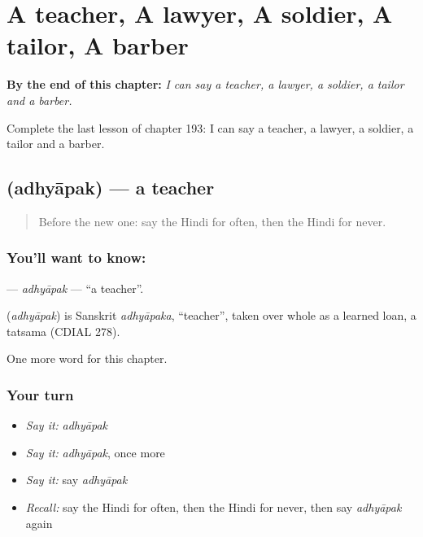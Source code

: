 
\chapter{A teacher, A lawyer, A soldier, A tailor, A barber}
\label{ch:hi-a-teacher-a-lawyer-a-soldier-a-tailor-a-barber}

\begin{chapteropening}
\textbf{By the end of this chapter:} \emph{I can say a teacher, a lawyer, a soldier, a tailor and a barber.}

Complete the last lesson of chapter 193: I can say a teacher, a lawyer, a soldier, a tailor and a barber.
\end{chapteropening}

\section[\texorpdfstring{\hi{अध्यापक} (adhyāpak)}{अध्यापक (adhyāpak)}]{ (adhyāpak) — a teacher}

\label{lesson:HI-C193-adhyapak}



\begin{quote}
Before the new one: say the Hindi for often, then the Hindi for never.
\end{quote}

\subsection*{You'll want to know: }
\textbf{} — \emph{adhyāpak} — \textquotedblleft{}a teacher\textquotedblright{}.

\begin{cousinweb}
\textbf{} (\emph{adhyāpak}) is Sanskrit \emph{adhyāpaka}, \textquotedblleft{}teacher\textquotedblright{}, taken over whole as a learned loan, a tatsama (CDIAL 278).
\end{cousinweb}

\begin{grammarlens}[title={What you've built}]
One more word for this chapter.
\end{grammarlens}

\subsection*{Your turn}
\begin{itemize}
\raggedright
  \item \emph{Say it:} \emph{adhyāpak}
  \item \emph{Say it:} \emph{adhyāpak}, once more
  \item \emph{Say it:} say \emph{adhyāpak}
  \item \emph{Recall:} say the Hindi for often, then the Hindi for never, then say \emph{adhyāpak} again
\end{itemize}

